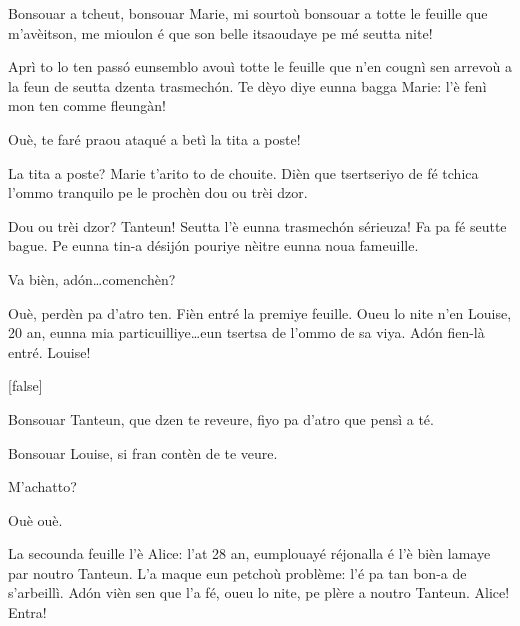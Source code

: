 \begin{drama}
\Tanteunspeaks Bonsouar a tcheut, bonsouar Marie, mi sourtoù bonsouar a totte le feuille que m'avèitson, me mioulon é que son belle itsaoudaye pe mé seutta nite! 


\Tanteunspeaks{} Aprì to lo ten pass\'o eunsemblo avouì totte le feuille que n’en cougnì sen arrevoù a la feun de seutta dzenta trasmech\'on. Te dèyo diye eunna bagga Marie: l'è fenì mon ten comme fleungàn!

\Mariespeaks  Ouè, te faré praou ataqué a betì la tita a poste!

\Tanteunspeaks La tita a poste? Marie t’arito to de chouite. Dièn que tsertseriyo de fé tchica l'ommo tranquilo pe le prochèn dou ou trèi dzor.

\Mariespeaks Dou ou trèi dzor? Tanteun! Seutta l'è eunna trasmech\'on sérieuza! Fa pa fé seutte bague. Pe eunna tin-a désij\'on pouriye nèitre eunna noua fameuille.

\Tanteunspeaks{} Va bièn, ad\'on\ldots comenchèn?

\Mariespeaks Ouè, perdèn pa d'atro ten. Fièn entré la premiye feuille. Oueu lo nite n'en Louise, 20 an, eunna mia particuilliye\ldots eun tsertsa de l'ommo de sa viya. Ad\'on fien-là entré. Louise!

[false]%


\Louisespeaks Bonsouar Tanteun, que dzen te reveure, fiyo pa d'atro que pensì a té.

\Tanteunspeaks{} Bonsouar Louise,  si fran con\-tèn de te veure.

\Louisespeaks M'achatto?

\Tanteunspeaks Ouè ouè.


\Mariespeaks La secounda feuille l'è Alice: l'at 28 an, eumplouayé réjonalla é l'è bièn lamaye par noutro Tanteun. L'a maque eun petchoù problème: l'é pa tan bon-a de s'arbeillì. Ad\'on vièn sen que l'a fé, oueu lo nite, pe plère a noutro Tanteun. Alice! Entra!


\end{drama}
